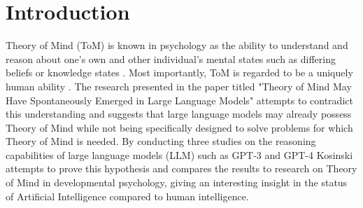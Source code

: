 \section{Introduction}

Theory of Mind (ToM) is known in psychology as the ability to understand and reason about one's own and other individual's mental states such as differing beliefs or knowledge states \cite{theory_of_mind}. Most importantly, ToM is regarded to be a uniquely human ability \cite{tom_in_animals}. The research presented in the paper titled "Theory of Mind May Have Spontaneously Emerged in Large Language Models" attempts to contradict this understanding and suggests that large language models may already possess Theory of Mind while not being specifically designed to solve problems for which Theory of Mind is needed. By conducting three studies on the reasoning capabilities of large language models (LLM) such as GPT-3 and GPT-4 Kosinski attempts to prove this hypothesis and compares the results to research on Theory of Mind in developmental psychology, giving an interesting insight in the status of Artificial Intelligence compared to human intelligence.